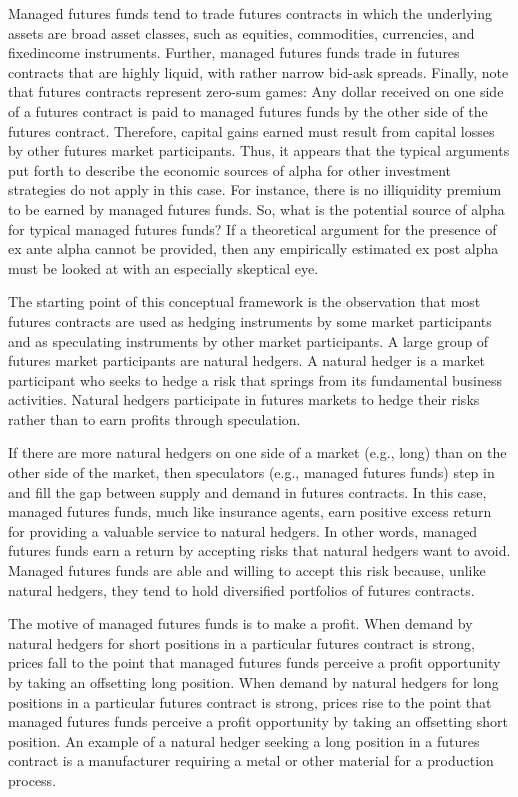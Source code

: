 \documentclass[11pt]{article}
\begin{document}
Managed futures funds tend to trade futures contracts in which the underlying assets are broad asset classes, such as equities, commodities, currencies, and fixedincome instruments. Further, managed futures funds trade in futures contracts that are highly liquid, with rather narrow bid-ask spreads. Finally, note that futures contracts represent zero-sum games: Any dollar received on one side of a futures contract is paid to managed futures funds by the other side of the futures contract. Therefore, capital gains earned must result from capital losses by other futures market participants. Thus, it appears that the typical arguments put forth to describe the economic sources of alpha for other investment strategies do not apply in this case. For instance, there is no illiquidity premium to be earned by managed futures funds. So, what is the potential source of alpha for typical managed futures funds? If a theoretical argument for the presence of ex ante alpha cannot be provided, then any empirically estimated ex post alpha must be looked at with an especially skeptical eye.

The starting point of this conceptual framework is the observation that most futures contracts are used as hedging instruments by some market participants and as speculating instruments by other market participants. A large group of futures market participants are natural hedgers. A natural hedger is a market participant who seeks to hedge a risk that springs from its fundamental business activities. Natural hedgers participate in futures markets to hedge their risks rather than to earn profits through speculation.

If there are more natural hedgers on one side of a market (e.g., long) than on the other side of the market, then speculators (e.g., managed futures funds) step in and fill the gap between supply and demand in futures contracts. In this case, managed futures funds, much like insurance agents, earn positive excess return for providing a valuable service to natural hedgers. In other words, managed futures funds earn a return by accepting risks that natural hedgers want to avoid. Managed futures funds are able and willing to accept this risk because, unlike natural hedgers, they tend to hold diversified portfolios of futures contracts.

The motive of managed futures funds is to make a profit. When demand by natural hedgers for short positions in a particular futures contract is strong, prices fall to the point that managed futures funds perceive a profit opportunity by taking an offsetting long position. When demand by natural hedgers for long positions in a particular futures contract is strong, prices rise to the point that managed futures funds perceive a profit opportunity by taking an offsetting short position. An example of a natural hedger seeking a long position in a futures contract is a manufacturer requiring a metal or other material for a production process.
\end{document}
